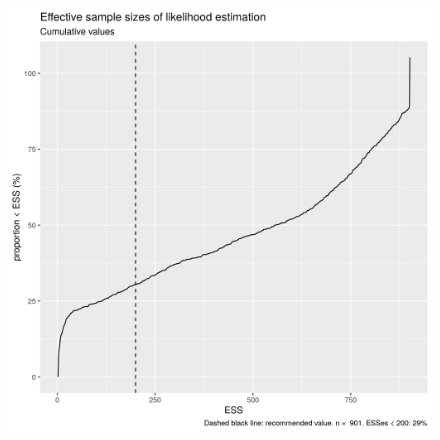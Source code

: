 \begin{figure}[!htbp]
  \includegraphics[width=\textwidth]{20190905_fig_esses_cumulative.png}
  \label{fig:esses_cumulative}
\end{figure}




